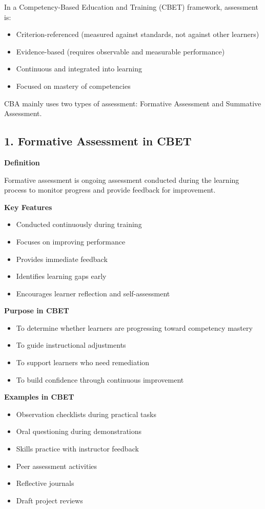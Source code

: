 \documentclass[12pt,a4paper]{article}
\begin{document}
In a Competency-Based Education and Training (CBET) framework, assessment is:
\begin{itemize}
    \item Criterion-referenced (measured against standards, not against other learners)
    \item Evidence-based (requires observable and measurable performance)
    \item Continuous and integrated into learning
    \item Focused on mastery of competencies
\end{itemize}

CBA mainly uses two types of assessment: Formative Assessment and Summative Assessment.

\subsection*{1. Formative Assessment in CBET}

\textbf{Definition}

Formative assessment is ongoing assessment conducted during the learning process to monitor progress and provide feedback for improvement.

\textbf{Key Features}
\begin{itemize}
    \item Conducted continuously during training
    \item Focuses on improving performance
    \item Provides immediate feedback
    \item Identifies learning gaps early
    \item Encourages learner reflection and self-assessment
\end{itemize}

\textbf{Purpose in CBET}
\begin{itemize}
    \item To determine whether learners are progressing toward competency mastery
    \item To guide instructional adjustments
    \item To support learners who need remediation
    \item To build confidence through continuous improvement
\end{itemize}

\textbf{Examples in CBET}
\begin{itemize}
    \item Observation checklists during practical tasks
    \item Oral questioning during demonstrations
    \item Skills practice with instructor feedback
    \item Peer assessment activities
    \item Reflective journals
    \item Draft project reviews
\end{itemize}
\end{document}
